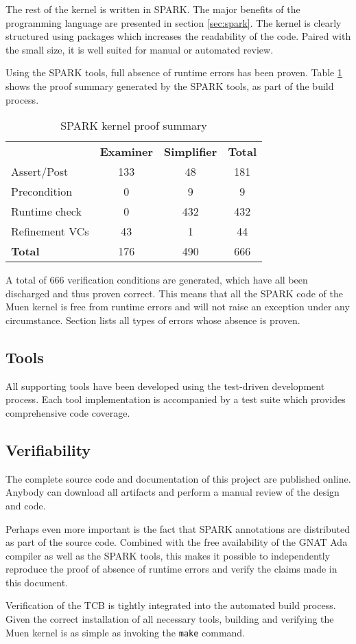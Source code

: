 The rest of the kernel is written in SPARK. The major benefits of the
programming language are presented in section \ref{sec:spark}. The kernel is
clearly structured using packages which increases the readability of the code.
Paired with the small size, it is well suited for manual or automated review.

Using the SPARK tools, full absence of runtime errors has been proven. Table
\ref{tab:kernel-proof-sum} shows the proof summary generated by the SPARK tools,
as part of the build process.

\begin{table}[h]
	\centering
	\begin{tabular}{l c c c}
		& \textbf{Examiner} & \textbf{Simplifier} & \textbf{Total} \\
		Assert/Post    & 133 & 48  & 181 \\
		Precondition   & 0   & 9   & 9   \\
		Runtime check  & 0   & 432 & 432 \\
		Refinement VCs & 43  & 1   & 44 \\
		\hline
		\textbf{Total} & 176 & 490 & 666 \\
	\end{tabular}
	\caption{SPARK kernel proof summary}
	\label{tab:kernel-proof-sum}
\end{table}

A total of 666 verification conditions are generated, which have all been
discharged and thus proven correct. This means that all the SPARK code of the
Muen kernel is free from runtime errors and will not raise an exception under
any circumstance. Section lists all types of errors whose absence is proven.

\subsection{Tools}
All supporting tools have been developed using the test-driven development
process. Each tool implementation is accompanied by a test suite which provides
comprehensive code coverage.

\subsection{Verifiability}
The complete source code and documentation of this project are published online.
Anybody can download all artifacts and perform a manual review of the design and
code.

Perhaps even more important is the fact that SPARK annotations are distributed
as part of the source code. Combined with the free availability of the GNAT Ada
compiler as well as the SPARK tools, this makes it possible to independently
reproduce the proof of absence of runtime errors and verify the claims made in
this document.

Verification of the TCB is tightly integrated into the automated build process.
Given the correct installation of all necessary tools, building and verifying
the Muen kernel is as simple as invoking the \texttt{make} command.
